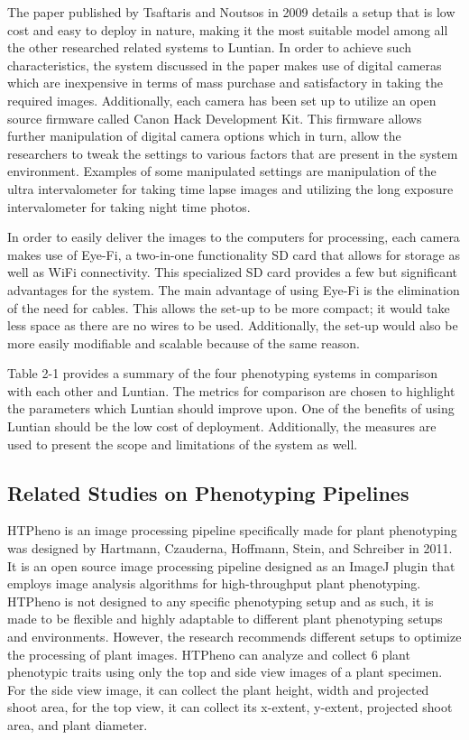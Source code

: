 The paper published by Tsaftaris and Noutsos in 2009 details a setup that is low cost and easy to deploy in nature, making it the most suitable model among all the other researched related systems to Luntian. In order to achieve such characteristics, the system discussed in the paper makes use of digital cameras which are inexpensive in terms of mass purchase and satisfactory in taking the required images. Additionally, each camera  has been set up to utilize an open source firmware called Canon Hack Development Kit. This firmware allows further manipulation of digital camera options which in turn, allow the researchers to tweak the settings to various factors that are present in the system environment. Examples of some manipulated settings are manipulation of the ultra intervalometer for taking time lapse images and utilizing the long exposure intervalometer for taking night time photos.

In order to easily deliver the images to the computers for processing, each camera makes use of Eye-Fi, a two-in-one functionality SD card that allows for storage as well as WiFi connectivity. This specialized SD card provides a few but significant advantages for the system. The main advantage of using Eye-Fi is the elimination of the need for cables. This allows the set-up to be more compact; it would take less space as there are no wires to be used. Additionally, the set-up would also be more easily modifiable and scalable because of the same reason.

Table 2-1 provides a summary of the four phenotyping systems in comparison with each other and Luntian.  The metrics for comparison are chosen to highlight the parameters which Luntian should improve upon. One of the benefits of using Luntian should be the low cost of deployment. Additionally, the measures are used to present the scope and limitations of the system as well.

\subsection{Related Studies on Phenotyping Pipelines}
\label{sec:multitouchtechnology}

HTPheno is an image processing pipeline specifically made for plant phenotyping was designed by Hartmann, Czauderna, Hoffmann, Stein, and Schreiber in 2011. It  is an open source image processing pipeline designed as an ImageJ plugin that employs image analysis algorithms for high-throughput plant phenotyping. HTPheno is not designed to any specific phenotyping setup and as such, it is made to be flexible and highly adaptable to different plant phenotyping setups and environments. However, the research recommends different setups to optimize the processing of plant images. HTPheno can analyze and collect 6 plant phenotypic traits using only the top and side view images of a plant specimen. For the side view image, it can collect the plant height, width and projected shoot area, for the top view, it can collect its x-extent, y-extent, projected shoot area, and plant diameter.
 
